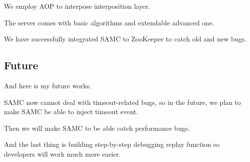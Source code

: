 We employ AOP to interpose interposition layer.

The server comes with basic algorithms and extendable advanced one.

We have successfully integrated SAMC to ZooKeeper to catch old and new bugs.

\subsection{Future}

And here is my future works.

SAMC now cannot deal with timeout-related bugs, so in the future, we plan to
make SAMC be able to inject timeout event.

Then we will make SAMC to be able catch performance bugs.

And the last thing is building step-by-step debugging replay function so
developers will work much more easier.

